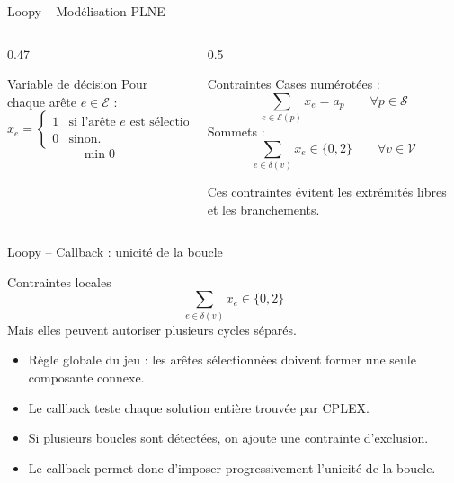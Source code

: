\documentclass[11pt,aspectratio=169]{beamer}
\begin{document}
\begin{frame}{Loopy -- Modélisation PLNE}
\small
\begin{columns}[T,onlytextwidth]
\begin{column}{0.47\textwidth}
\begin{block}{Variable de décision}
Pour chaque arête \(e\in\mathcal{E}\) :
\[
x_e =
\begin{cases}
1 & \text{si l'arête } e \text{ est sélectionnée,}\\
0 & \text{sinon.}
\end{cases}
\]
\[
\min 0
\]
\end{block}
\end{column}
\begin{column}{0.5\textwidth}
\begin{block}{Contraintes}
Cases numérotées :
\[
\sum_{e\in\mathcal{E}(p)}x_e=a_p
\qquad \forall p\in\mathcal{S}
\]
Sommets :
\[
\sum_{e\in\delta(v)}x_e\in\{0,2\}
\qquad \forall v\in\mathcal{V}
\]
\end{block}
Ces contraintes évitent les extrémités libres et les branchements.
\end{column}
\end{columns}
\end{frame}

\begin{frame}{Loopy -- Callback : unicité de la boucle}
\small
\begin{block}{Contraintes locales}
\[
\sum_{e\in\delta(v)}x_e\in\{0,2\}
\]
Mais elles peuvent autoriser plusieurs cycles séparés.
\end{block}

\begin{itemize}
  \item Règle globale du jeu : les arêtes sélectionnées doivent former une seule composante connexe.
  \item Le callback teste chaque solution entière trouvée par CPLEX.
  \item Si plusieurs boucles sont détectées, on ajoute une contrainte d'exclusion.
  \item Le callback permet donc d'imposer progressivement l'unicité de la boucle.
\end{itemize}
\end{frame}
\end{document}
